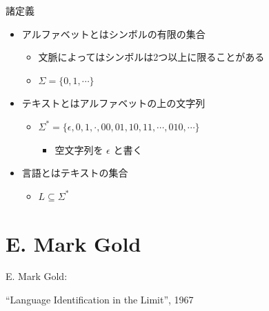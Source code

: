 \documentclass[professionalfont, 12pt, dvipdfmx, default, cjk]{beamer}
\begin{document}
\begin{frame}{諸定義}

\begin{itemize}
\itemsep1pt\parskip0pt
\item
  アルファベットとはシンボルの\alert{有限の}集合

  \begin{itemize}
  \itemsep1pt\parskip0pt
  \item
    文脈によってはシンボルは2つ以上に限ることがある
  \item
    \(\Sigma = \{ 0, 1, \cdots \}\)
  \end{itemize}
\item
  テキストとはアルファベットの上の文字列

  \begin{itemize}
  \itemsep1pt\parskip0pt
  \item
    \(\Sigma^* = \{ \epsilon, 0, 1, \cdot, 00, 01, 10, 11, \cdots, 010, \cdots \}\)

    \begin{itemize}
    \itemsep1pt\parskip0pt
    \item
      空文字列を \(\epsilon\) と書く
    \end{itemize}
  \end{itemize}
\item
  言語とはテキストの集合

  \begin{itemize}
  \itemsep1pt\parskip0pt
  \item
    \(L \subseteq \Sigma^*\)
  \end{itemize}
\end{itemize}

\end{frame}

\section{E. Mark Gold}\label{e.-mark-gold}

\begin{frame}{E. Mark Gold:}

\fontsize{19pt}{20pt} \selectfont

``Language Identification in the Limit'', 1967

\end{frame}
\end{document}
